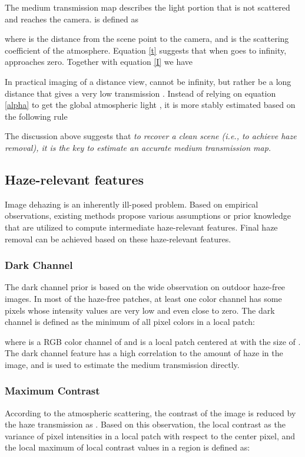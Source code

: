 \documentclass[journal]{IEEEtran}
\begin{document}
The medium transmission map  describes the light portion that is not scattered and reaches the camera.  is defined as

where  is the distance from the scene point to the camera, and  is the scattering coefficient of the atmosphere. Equation \eqref{t} suggests that when  goes to infinity,  approaches zero. Together with equation \eqref{I} we have

In practical imaging of a distance view,  cannot be infinity, but rather be a long distance that gives a very low transmission . Instead of relying on equation \eqref{alpha} to get the global atmospheric light , it is more stably estimated based on the following rule


The discussion above suggests that \emph{to recover a clean scene (i.e., to achieve haze removal), it is the key to estimate an accurate medium transmission map.}

\subsection{Haze-relevant features}\label{sec:features}
Image dehazing is an inherently ill-posed problem. Based on empirical observations, existing methods propose various assumptions or prior knowledge that are utilized to compute intermediate haze-relevant features. Final haze removal can be achieved based on these haze-relevant features.
\subsubsection{Dark Channel}
The dark channel prior is based on the wide observation on outdoor haze-free images. In most of the haze-free patches, at least one color channel has some pixels whose intensity values are very low and even close to zero. The dark channel \cite{dcp} is defined as the minimum of all pixel colors in a local patch:

where  is a RGB color channel of  and  is a local patch centered at  with the size of . The dark channel feature has a high correlation to the amount of haze in the image, and is used to estimate the medium transmission  directly.

\subsubsection{Maximum Contrast}
According to the atmospheric scattering, the contrast of the image is reduced by the haze transmission as  . Based on this observation, the local contrast \cite{maxcontrast} as the variance of pixel intensities in a  local patch  with respect to the center pixel, and the local maximum of local contrast values in a  region  is defined as:
\end{document}
